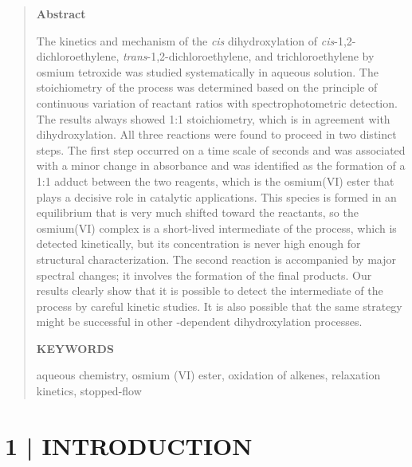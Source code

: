 \documentclass{article}
\begin{document}
\begin{quote}
\noindent\textbf{Abstract}\par
\noindent The kinetics and mechanism of the \emph{cis} dihydroxylation of \emph{cis}-1,2-dichloroethylene, \emph{trans}-1,2-dichloroethylene, and trichloroethylene by osmium tetroxide was studied systematically in aqueous solution. The stoichiometry of the process was determined based on the principle of continuous variation of reactant ratios with spectrophotometric detection. The results always showed 1:1 stoichiometry, which is in agreement with dihydroxylation. All three reactions were found to proceed in two distinct steps. The first step occurred on a time scale of seconds and was associated with a minor change in absorbance and was identified as the formation of a 1:1 adduct between the two reagents, which is the osmium(VI) ester that plays a decisive role in catalytic applications. This species is formed in an equilibrium that is very much shifted toward the reactants, so the osmium(VI) complex is a short-lived intermediate of the process, which is detected kinetically, but its concentration is never high enough for structural characterization. The second reaction is accompanied by major spectral changes; it involves the formation of the final products. Our results clearly show that it is possible to detect the intermediate of the process by careful kinetic studies. It is also possible that the same strategy might be successful in other -dependent dihydroxylation processes.

\medskip
\noindent\textbf{KEYWORDS}\par
\noindent aqueous chemistry, osmium (VI) ester, oxidation of alkenes, relaxation kinetics, stopped-flow
\end{quote}

\section*{1 \quad | \quad INTRODUCTION}
\end{document}
